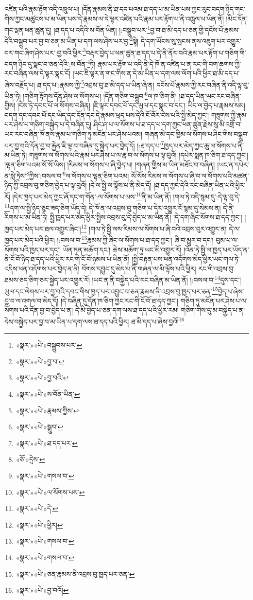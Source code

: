 འཛིན་པའི་རྣམ་རྟོག་འདི་འཁྲུལ་པ། །དོན་རྣམས་ནི་ཐ་དད་པའམ་ཐ་དད་པ་མ་ཡིན་པས་ཀྱང་རུང་བདག་ཉིད་གང་གིས་ཀྱང་མཚུངས་པ་མ་ཡིན་པས་དེ་རྣམས་ལ་དེ་ལྟར་འཛིན་པའི་རྣམ་པར་རྟོག་པ་ནི་འཁྲུལ་པ་ཡིན་ནོ། །མིང་དོན་གང་ལྡན་ཕན་ཚུན་དུ། །ཐ་དད་པ་འདིའི་ས་བོན་ཡིན། །:བསྒྲུབ་པར་\footnote{«སྣར་»«པེ་»བསྒྲུབས་པར་}བྱ་བ་ཐ་མི་དད་པ་ཅན་གྱི་དངོས་པོ་རྣམས་དེའི་བསྒྲུབ་པར་བྱ་བ་ཅན་མ་ཡིན་པ་དག་ལས་ཤེས་པར་བྱ་\footnote{«སྣར་»«པེ་»བྱ་བ་}སྟེ། དེ་དག་ཡོངས་སུ་སྤངས་ནས་འཇུག་པར་འགྱུར་བར་གང་ཞིག་ཤེས་པར་:བྱ་བའི་ཕྱིར་\footnote{«སྣར་»«པེ་»བྱ་བའི་}བརྡར་བྱེད་པ་ཕན་ཚུན་ཐ་དད་པ་དེ་ནི་ནོར་བའི་རྣམ་པར་རྟོག་པ་གཅིག་གི་བདག་ཉིད་དུ་སྣང་བ་ཅན་དེའི་:ས་བོན་\footnote{«སྣར་»«པེ་»ས་བོན་ཡིན་}ཏེ། རྣམ་པར་རྟོག་པ་འདི་ནི་དེ་ཁོ་ན་འཛིན་པ་ན་རང་གི་བག་ཆགས་ཀྱི་རང་བཞིན་ལས་དེ་ལྟར་སྣང་ངོ། །ཡང་ཇི་ལྟར་ན་གང་གིས་ན་དེ་མ་ཡིན་པ་དག་ལས་ལོག་པའི་ཕྱིར་ཐ་མི་དད་པ་ཞེས་བརྗོད་པ། ཐ་དད་པ་:རྣམས་ཀྱི་\footnote{«སྣར་»«པེ་»རྣམས་ཀྱིས་}འབྲས་བུ་ཐ་མི་དད་པ་ཡིན་ཞེ་ན། དངོས་པོ་རྣམས་ཀྱི་རང་བཞིན་ནི་འདི་ལྟ་བུ་ཡིན་ཏེ། །གཅིག་རྟོགས་དོན་ཤེས་ལ་སོགས་པ། །དོན་གཅིག་བསྒྲུབ་\footnote{«སྣར་»«པེ་»སྒྲུབ་}ལ་ཁ་ཅིག་ནི། །ཐ་དད་ཡིན་ཡང་རང་བཞིན་གྱིས། །ངེས་ཏེ་དབང་པོ་ལ་སོགས་བཞིན། །ཇི་ལྟར་དབང་པོ་དང་ཡུལ་དང་སྣང་བ་དང་། ཡིད་ལ་བྱེད་པ་རྣམས་སམ། བདག་དང་དབང་པོ་དང་ཡིད་དང་དོན་དང་དེ་རྣམས་ཕྲད་པས་དེའི་ངོ་བོར་ངེས་པའི་སྤྱི་མེད་ཀྱང་། གཟུགས་ཀྱི་རྣམ་པར་ཤེས་པ་གཅིག་བསྐྱེད་པ་དེ་བཞིན་དུ། ཤིང་ཤ་པ་ལ་སོགས་པ་ཐ་དད་པ་དག་ཀྱང་ཕན་ཚུན་རྗེས་སུ་མི་འགྲོ་བ་ཡང་རང་བཞིན་ཁོ་ནས་རྣམ་པ་གཅིག་ཏུ་མངོན་པར་ཤེས་པའམ། གཞན་མེ་དང་ཁྱིམ་ལ་སོགས་པ་ཤིང་གིས་བསྒྲུབ་པར་བྱ་བའི་དོན་བྱ་བ་རྐྱེན་ཇི་ལྟ་བ་བཞིན་དུ་སྐྱེད་པར་བྱེད་དོ། །:ཐ་དད་པ་\footnote{«སྣར་»«པེ་»ཐ་དད་པར་}ཁྱད་པར་མེད་ཀྱང་ཆུ་ལ་སོགས་པ་ནི་མ་ཡིན་ཏེ། གཟུགས་ལ་སོགས་པའི་རྣམ་པར་ཤེས་པ་ལ་རྣ་བ་ལ་སོགས་པ་ལྟ་བུའོ། །དཔེར་སྨན་ཁ་ཅིག་ཐ་དད་ཀྱང་། །ལྷན་ཅིག་པའམ་སོ་སོ་ཡིས། །རིམས་ལ་སོགས་པ་ཞི་བྱེད་པ། །གཞན་གྱིས་མ་ཡིན་མཐོང་བ་བཞིན། །ཡང་ན་དཔེར་ན་སླེ་ཏྲེས་\footnote{«ཅོ་»དྲེས་}ཀྱིས་:བསལ་བ་\footnote{«སྣར་»«པེ་»གསལ་བ་}ལ་སོགས་པ་ལྷན་ཅིག་པའམ། སོ་སོས་རིམས་ལ་སོགས་པ་ཞི་བ་ལ་སོགས་པའི་མཚན་ཉིད་ཀྱི་འབྲས་བུ་གཅིག་བྱེད་པ་ལྟ་བུའོ། །དེ་ལ་སྤྱི་ལ་ལྟོས་པ་ནི་མེད་དོ། །ཐ་དད་ཀྱང་དེའི་རང་བཞིན་ཡིན་པའི་ཕྱིར་རོ། །དེར་ཁྱད་པར་མེད་ཀྱང་ཞོ་དང་ག་གོན་:ལ་སོགས་པ་ལས་\footnote{«སྣར་»«པེ་»ལ་སོགས་པས་}ནི་མ་ཡིན་ནོ། །གལ་ཏེ་འདི་སྙམ་དུ་:དེ་ལྟ་བུ་དེ་\footnote{«སྣར་»«པེ་»དེ་}དག་ལ་སྤྱི་ཉིད་ཅུང་ཟད་ཅིག་ཡོད་དེ། དེ་ཁོ་ན་ལ་འབྲས་བུ་གཅིག་པ་དེར་འགྱུར་རོ་སྙམ་དུ་སེམས་ན། དེ་ནི་རིགས་པ་མ་ཡིན་ཏེ། སྤྱི་ཁྱད་པར་མེད་ཕྱིར་སྤྱིས་འབྲས་བུ་དེ་བྱེད་པ་མ་ཡིན་ནོ། །དེ་དག་ཞིང་སོགས་ཐ་དད་ཀྱང་། །ཁྱད་པར་མེད་པར་ཐལ་འགྱུར་ཞིང་།\footnote{«སྣར་»«པེ་»ཕྱིར།} །གལ་ཏེ་སྤྱི་ལས་རིམས་ལ་སོགས་པ་ཞི་བའི་འབྲས་བུར་འགྱུར་ན། དེ་ལ་ཁྱད་པར་མེད་པའི་ཕྱིར། །:བསལ་བ་\footnote{«སྣར་»«པེ་»གསལ་བ་}རྣམས་ཀྱི་ཞིང་ལ་སོགས་པ་ཐ་དད་ཀྱང་། ཞི་བ་མྱུར་བ་དང་། བུམ་པ་ལ་སོགས་པའི་ཁྱད་པར་དང་། ཡོན་ཏན་མཆོག་དང་། ཆེས་མཆོག་ཏུ་ཡང་མི་འགྱུར་རོ། །འོན་ཏེ་སྤྱི་ལ་ཁྱད་པར་ཡོད་ན་ནི་ངོ་བོ་ཉིད་ཐ་དད་པའི་ཕྱིར་རང་གི་ངོ་བོ་ཉམས་པ་ཡིན་ནོ། །སྤྱི་བརྟན་པས་ཕན་འདོགས་མེད་ཕྱིར་ཡང་གལ་ཏེ་འདིས་ཕན་འདོགས་པར་བྱེད་ན་ནི། བོགས་དབྱུང་དུ་མེད་པ་ནི་གཞན་ལ་མི་ལྟོས་པའི་ཕྱིར། རང་གི་འབྲས་བུ་ཐམས་ཅད་ཅིག་ཅར་སྐྱེད་པར་འགྱུར་རོ། །ཡང་ན་ནི་བསྐྱེད་པའི་རང་བཞིན་མ་ཡིན་ནོ། །:བསལ་བ་\footnote{«སྣར་»«པེ་»གསལ་བ་}དུས་དང་། ཡུལ་དང་ལེགས་པར་བྱ་བའི་དབང་གིས་ཁྱད་པར་འབྱུང་བ་ཅན་རྣམས་ནི་འབྲས་བུ་ཁྱད་པར་ཅན་\footnote{«སྣར་»«པེ་»ཅན་རྣམས་ནི་འབྲས་བུ་ཁྱད་པར་ཅན་}བྱེད་པ་ཞེས་བྱ་བ་ལ་འགལ་བ་མེད་དོ། །དེ་བཞིན་དུ་དོན་ཁ་ཅིག་ཀྱང་རང་གི་ངོ་བོ་ཐ་དད་ཀྱང་། གཅིག་ཏུ་མངོན་པར་ཤེས་པ་ལ་སོགས་པའི་དོན་བྱ་བ་བྱེད་པ་ན། དེ་མི་བྱེད་པ་ཅན་དག་ལས་ཐ་དད་པའི་ཕྱིར་རམ། གཅིག་གིས་དུ་མ་བསྐྱེད་པ་ན་དེས་བསྐྱེད་པར་བྱ་བ་མ་ཡིན་པ་དག་ལས་ཐ་དད་པའི་ཕྱིར། ཐ་མི་དད་པ་ཞེས་བྱའོ།\footnote{«སྣར་»«པེ་»བྱ་བའོ།} 
